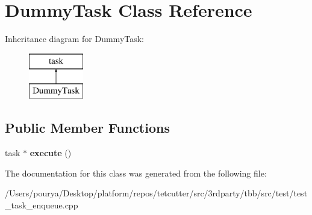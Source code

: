 \hypertarget{classDummyTask}{}\section{Dummy\+Task Class Reference}
\label{classDummyTask}
Inheritance diagram for Dummy\+Task\+:\begin{figure}[H]
\begin{center}
\leavevmode
\includegraphics[height=2.000000cm]{classDummyTask}
\end{center}
\end{figure}
\subsection*{Public Member Functions}
\begin{DoxyCompactItemize}
\item 
\hypertarget{classDummyTask_aa41805412dfe5045e71d1cc75d8dfcac}{}task $\ast$ {\bfseries execute} ()\label{classDummyTask_aa41805412dfe5045e71d1cc75d8dfcac}

\end{DoxyCompactItemize}


The documentation for this class was generated from the following file\+:\begin{DoxyCompactItemize}
\item 
/\+Users/pourya/\+Desktop/platform/repos/tetcutter/src/3rdparty/tbb/src/test/test\+\_\+task\+\_\+enqueue.\+cpp\end{DoxyCompactItemize}
